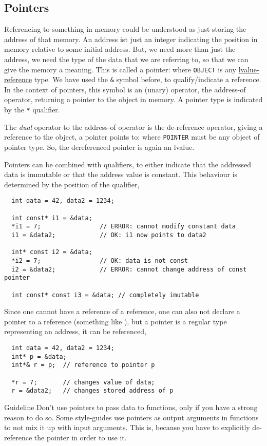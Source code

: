 \subsection{Pointers}
Referencing to something in memory could be understood as just storing the address of that memory. An address ist just an integer indicating
the position in memory relative to some initial address. But, we need more than just the address, we need the type of the data that we are
referring to, so that we can give the memory a meaning. This is called a pointer:
%
%
where \texttt{OBJECT} is any \underline{lvalue-reference} type.
We have used the \texttt{\&} symbol before, to qualify/indicate a reference. In the context of pointers, this symbol is an (unary) operator, the
address-of operator, returning a pointer to the object in memory. A pointer type is indicated by the \texttt{*} qualifier.

The \textit{dual} operator to the address-of operator is the de-reference operator, giving a reference to the object, a pointer points to:
%
%
where \texttt{POINTER} must be any object of pointer type. So, the dereferenced pointer is again an lvalue.

Pointers can be combined with  qualifiers, to either indicate that the addressed data is immutable or that the address value is constant.
This behaviour is determined by the position of the  qualifier, \ie
%
\begin{verbatim}
  int data = 42, data2 = 1234;

  int const* i1 = &data;
  *i1 = 7;                // ERROR: cannot modify constant data
  i1 = &data2;            // OK: i1 now points to data2

  int* const i2 = &data;
  *i2 = 7;                // OK: data is not const
  i2 = &data2;            // ERROR: cannot change address of const pointer

  int const* const i3 = &data; // completely imutable
\end{verbatim}

Since one cannot have a reference of a reference, one can also not declare a pointer to a reference (something like ), but a
pointer is a regular type representing an address, it can be referenced, \ie
%
\begin{verbatim}
  int data = 42, data2 = 1234;
  int* p = &data;
  int*& r = p;  // reference to pointer p

  *r = 7;       // changes value of data;
  r = &data2;   // changes stored address of p
\end{verbatim}

\begin{guideline}{Guideline}
  Don't use pointers to pass data to functions, only if you have a strong reason to do so. Some style-guides use pointers as output arguments
  in functions to not mix it up with input arguments. This is, because you have to explicitly de-reference the pointer in order to use it.
\end{guideline}
